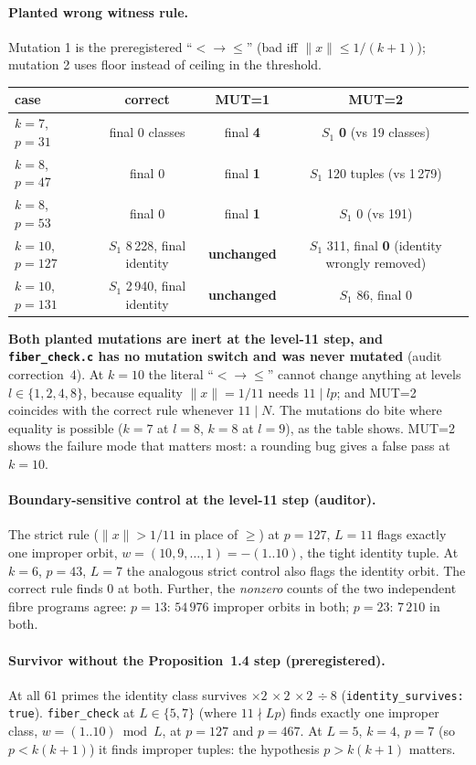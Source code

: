 \documentclass[10pt]{article}
\begin{document}
\paragraph{Planted wrong witness rule.} Mutation 1 is the preregistered ``$<\to\le$'' (bad iff $\|x\|\le1/(k+1)$); mutation 2 uses floor instead of ceiling in the threshold.
\begin{center}\small\begin{tabular}{lccc}\toprule
case & correct & MUT=1 & MUT=2\\\midrule
$k=7$, $p=31$ & final $0$ classes & final \textbf{4} & $S_1$ \textbf{0} (vs 19 classes)\\
$k=8$, $p=47$ & final $0$ & final \textbf{1} & $S_1$ 120 tuples (vs 1\,279)\\
$k=8$, $p=53$ & final $0$ & final \textbf{1} & $S_1$ 0 (vs 191)\\
$k=10$, $p=127$ & $S_1$ 8\,228, final identity & \textbf{unchanged} & $S_1$ 311, final \textbf{0} (identity wrongly removed)\\
$k=10$, $p=131$ & $S_1$ 2\,940, final identity & \textbf{unchanged} & $S_1$ 86, final 0\\\bottomrule
\end{tabular}\end{center}
\textbf{Both planted mutations are inert at the level-11 step, and \texttt{fiber\_check.c} has no mutation switch and was never mutated} (audit correction~4). At $k=10$ the literal ``$<\to\le$'' cannot change anything at levels $l\in\{1,2,4,8\}$, because equality $\|x\|=1/11$ needs $11\mid lp$; and MUT=2 coincides with the correct rule whenever $11\mid N$. The mutations do bite where equality is possible ($k=7$ at $l=8$, $k=8$ at $l=9$), as the table shows. MUT=2 shows the failure mode that matters most: a rounding bug gives a false pass at $k=10$.
\paragraph{Boundary-sensitive control at the level-11 step (auditor).} The strict rule ($\|x\|>1/11$ in place of $\ge$) at $p=127$, $L=11$ flags exactly one improper orbit, $w=(10,9,\dots,1)=-(1..10)$, the tight identity tuple. At $k=6$, $p=43$, $L=7$ the analogous strict control also flags the identity orbit. The correct rule finds $0$ at both. Further, the \emph{nonzero} counts of the two independent fibre programs agree: $p=13$: $54\,976$ improper orbits in both; $p=23$: $7\,210$ in both.
\paragraph{Survivor without the Proposition~1.4 step (preregistered).} At all $61$ primes the identity class survives $\times2\,\times2\,\times2\,\div8$ (\texttt{identity\_survives: true}). \texttt{fiber\_check} at $L\in\{5,7\}$ (where $11\nmid Lp$) finds exactly one improper class, $w=(1..10)\bmod L$, at $p=127$ and $p=467$. At $L=5$, $k=4$, $p=7$ (so $p<k(k+1)$) it finds improper tuples: the hypothesis $p>k(k+1)$ matters.
\end{document}
